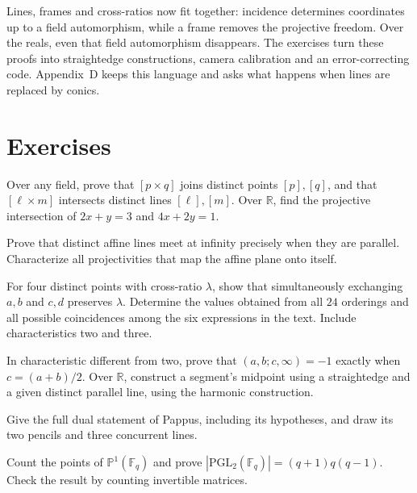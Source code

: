 Lines, frames and cross-ratios now fit together: incidence determines coordinates up to a field automorphism, while a frame removes the projective freedom. Over the reals, even that field automorphism disappears. The exercises turn these proofs into straightedge constructions, camera calibration and an error-correcting code. Appendix~D keeps this language and asks what happens when lines are replaced by conics.
\FloatBarrier

\section{Exercises}

\begin{exercise}[$\star$]\label{geometry:ex:crossproduct}
Over any field, prove that $[p\times q]$ joins distinct points $[p],[q]$, and that $[\ell\times m]$ intersects distinct lines $[\ell],[m]$. Over $\mathbb R$, find the projective intersection of $2x+y=3$ and $4x+2y=1$.
\end{exercise}
\begin{exercise}[$\star$]\label{geometry:ex:parallelinf}
Prove that distinct affine lines meet at infinity precisely when they are parallel. Characterize all projectivities that map the affine plane onto itself.
\end{exercise}
\begin{exercise}[$\star$]\label{geometry:ex:sixvalues}
For four distinct points with cross-ratio $\lambda$, show that simultaneously exchanging $a,b$ and $c,d$ preserves $\lambda$. Determine the values obtained from all $24$ orderings and all possible coincidences among the six expressions in the text. Include characteristics two and three.
\end{exercise}
\begin{exercise}[$\star$]\label{geometry:ex:harmonicmidpoint}
In characteristic different from two, prove that $(a,b;c,\infty)=-1$ exactly when $c=(a+b)/2$. Over $\mathbb R$, construct a segment's midpoint using a straightedge and a given distinct parallel line, using the harmonic construction.
\end{exercise}
\begin{exercise}[$\star$]\label{geometry:ex:dualpappus}
Give the full dual statement of Pappus, including its hypotheses, and draw its two pencils and three concurrent lines.
\end{exercise}
\begin{exercise}[$\star$]\label{geometry:ex:projline}
Count the points of $\mathbb P^1(\mathbb F_q)$ and prove $|\mathrm{PGL}_2(\mathbb F_q)|=(q+1)q(q-1)$. Check the result by counting invertible matrices.
\end{exercise}
